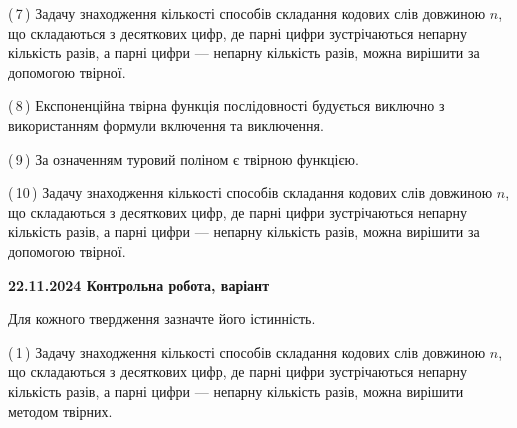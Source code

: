 \documentclass[12pt, ukrainian]{article}
\begin{document}
\begin {large}
\begin {large}
\begin {large}
\begin {large}
\begin {large}
\begin {large}
\begin {large}
\begin {large}
\begin {large}
\begin {large}
\begin {large}
\begin {large}
\begin {large}
\begin {large}
\begin {large}
\begin {large}
\begin {large}
\begin {large}
\begin {large}
\begin {large}
\begin {large}
\begin {large}
\begin {large}
\begin {large}
\begin {large}
\begin {large}
\begin {large}
\begin {large}
\begin {large}
\begin {large}
\begin {large}
\begin {large}
\begin {large}
\begin {large}
\begin {large}
\begin {large}
\begin {large}
\begin {large}
\begin {large}
\begin {large}
\begin {large}
\begin {large}
\begin {large}
\begin {large}
\begin {large}
\begin {large}
\begin {large}
{(\,7\,) Задачу знаходження кількості способів складання кодових слів довжиною $n$, що складаються з десяткових цифр, де парні цифри зустрічаються непарну кількість разів, а парні цифри — непарну кількість разів, можна вирішити за допомогою твірної.%



(\,8\,) Експоненційна твірна функція послідовності будується виключно з використанням формули включення та виключення.%



(\,9\,) За означенням туровий поліном є твірною функцією.%



(\,10\,) Задачу знаходження кількості способів складання кодових слів довжиною $n$, що складаються з десяткових цифр, де парні цифри зустрічаються непарну кількість разів, а парні цифри — непарну кількість разів, можна вирішити за допомогою твірної.%




\vspace{5mm}
}
\newpage

\begin {large}

\textbf{22.11.2024 Контрольна робота, варіант  }\par


{
Для кожного твердження зазначте його істинність.\par

\vspace{2mm}

(\,1\,) Задачу знаходження кількості способів складання кодових слів довжиною $n$, що складаються з десяткових цифр, де парні цифри зустрічаються непарну кількість разів, а парні цифри — непарну кількість разів, можна вирішити методом твірних.%



}
\end{large}
\end{large}
\end{large}
\end{large}
\end{large}
\end{large}
\end{large}
\end{large}
\end{large}
\end{large}
\end{large}
\end{large}
\end{large}
\end{large}
\end{large}
\end{large}
\end{large}
\end{large}
\end{large}
\end{large}
\end{large}
\end{large}
\end{large}
\end{large}
\end{large}
\end{large}
\end{large}
\end{large}
\end{large}
\end{large}
\end{large}
\end{large}
\end{large}
\end{large}
\end{large}
\end{large}
\end{large}
\end{large}
\end{large}
\end{large}
\end{large}
\end{large}
\end{large}
\end{large}
\end{large}
\end{large}
\end{large}
\end{large}
\end{document}

